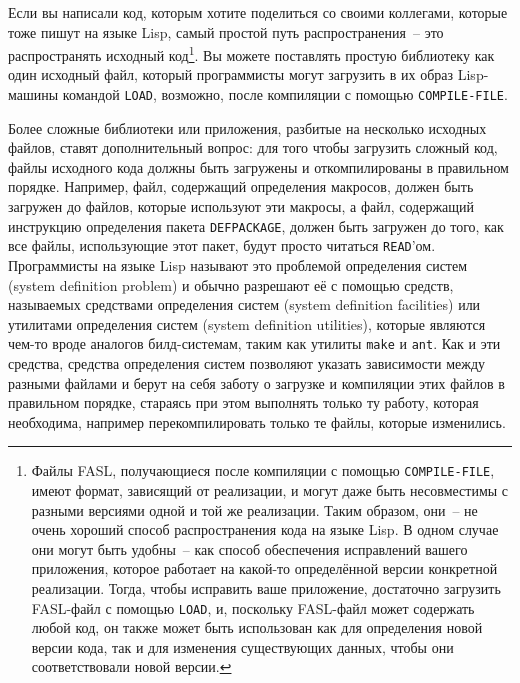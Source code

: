 Если вы написали код, которым хотите поделиться со своими коллегами, которые тоже пишут на
языке Lisp, самый простой путь распространения~-- это распространять исходный
код\footnote{Файлы FASL, получающиеся после компиляции с помощью \lstinline{COMPILE-FILE},
  имеют формат, зависящий от реализации, и могут даже быть несовместимы с разными версиями
  одной и той же реализации. Таким образом, они~-- не очень хороший способ распространения
  кода на языке Lisp. В одном случае они могут быть удобны~-- как способ обеспечения
  исправлений вашего приложения, которое работает на какой-то определённой версии
  конкретной реализации. Тогда, чтобы исправить ваше приложение, достаточно загрузить
  FASL-файл с помощью \lstinline{LOAD}, и, поскольку FASL-файл может содержать любой код, он
  также может быть использован как для определения новой версии кода, так и для изменения
  существующих данных, чтобы они соответствовали новой версии.}. Вы можете поставлять
простую библиотеку как один исходный файл, который программисты могут загрузить в их образ
Lisp-машины командой \lstinline{LOAD}, возможно, после компиляции с помощью
\lstinline{COMPILE-FILE}.

Более сложные библиотеки или приложения, разбитые на несколько исходных файлов, ставят
дополнительный вопрос: для того чтобы загрузить сложный код, файлы исходного кода должны
быть загружены и откомпилированы в правильном порядке. Например, файл, содержащий
определения макросов, должен быть загружен до файлов, которые используют эти макросы, а
файл, содержащий инструкцию определения пакета \lstinline{DEFPACKAGE}, должен быть загружен до
того, как все файлы, использующие этот пакет, будут просто читаться
\lstinline{READ}'ом. Программисты на языке Lisp называют это проблемой определения систем
(system definition problem) и обычно разрешают её с помощью средств, называемых средствами
определения систем (system definition facilities) или утилитами определения систем (system
definition utilities), которые являются чем-то вроде аналогов билд-системам, таким как
утилиты \lstinline{make} и \lstinline{ant}. Как и эти средства, средства определения систем
позволяют указать зависимости между разными файлами и берут на себя заботу о загрузке и
компиляции этих файлов в правильном порядке, стараясь при этом выполнять только ту работу,
которая необходима, например перекомпилировать только те файлы, которые изменились.

